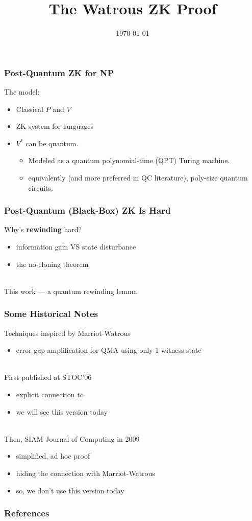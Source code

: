 \documentclass[aspectratio=1610, 12pt]{beamer}
\title{The Watrous ZK Proof}
\subtitle{}
\author{}
\institute{}
\date{\today}
\begin{document}
 

\frame{\titlepage}




\begin{frame}
\frametitle{Post-Quantum ZK for NP}

The model:
\begin{itemize}
\item
Classical $P$ and $V$
\item
ZK system for \NP languages
\item
$V^*$ can be quantum. 
\begin{itemize}
\item
Modeled as a quantum polynomial-time (QPT) Turing machine.
\item
equivalently (and more preferred in QC literature), poly-size quantum circuits. 
\end{itemize}
\end{itemize}
\end{frame}


\begin{frame}
\frametitle{Post-Quantum (Black-Box) ZK Is Hard}

Why's {\bf rewinding} hard?
\begin{itemize}
\item
    information gain VS state disturbance
\item
 the no-cloning theorem
\end{itemize}
~\\
This work --- a quantum rewinding lemma 
\end{frame}


\begin{frame}
\frametitle{Some Historical Notes}
Techniques inspired by Marriot-Watrous \cite{DBLP:conf/coco/MarriottW04} 
\begin{itemize}
\item error-gap amplification for QMA using only 1 witness state
\end{itemize}
~\\
First published at STOC'06 \cite{DBLP:conf/stoc/Watrous06}
\begin{itemize}
\item
explicit connection to \cite{DBLP:conf/coco/MarriottW04}
\item
we will see this version today
\end{itemize}
~\\
Then, SIAM Journal of Computing in 2009 \cite{DBLP:journals/siamcomp/Watrous09}
\begin{itemize}
\item
simplified, ad hoc proof
\item
hiding the connection with Marriot-Watrous
\item
so, we don't use this version today
\end{itemize}
\end{frame}



\begin{frame}%
        \frametitle{References}


\end{frame}
\end{document}
